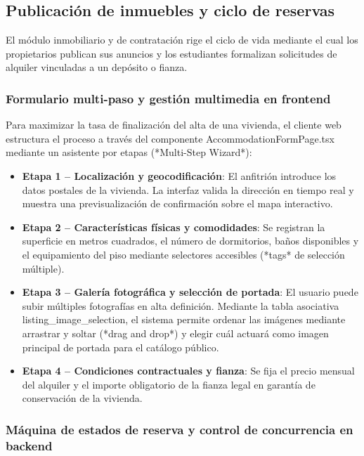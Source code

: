\subsection{Publicación de inmuebles y ciclo de reservas}
\label{subsec:publicacion_reservas}

El módulo inmobiliario y de contratación rige el ciclo de vida mediante el cual los propietarios publican sus anuncios y los estudiantes formalizan solicitudes de alquiler vinculadas a un depósito o fianza.

\subsubsection{Formulario multi-paso y gestión multimedia en frontend}

Para maximizar la tasa de finalización del alta de una vivienda, el cliente web estructura el proceso a través del componente AccommodationFormPage.tsx mediante un asistente por etapas (*Multi-Step Wizard*):

\begin{itemize}
    \item \textbf{Etapa 1 -- Localización y geocodificación}: El anfitrión introduce los datos postales de la vivienda. La interfaz valida la dirección en tiempo real y muestra una previsualización de confirmación sobre el mapa interactivo.
    \item \textbf{Etapa 2 -- Características físicas y comodidades}: Se registran la superficie en metros cuadrados, el número de dormitorios, baños disponibles y el equipamiento del piso mediante selectores accesibles (*tags* de selección múltiple).
    \item \textbf{Etapa 3 -- Galería fotográfica y selección de portada}: El usuario puede subir múltiples fotografías en alta definición. Mediante la tabla asociativa listing_image_selection, el sistema permite ordenar las imágenes mediante arrastrar y soltar (*drag and drop*) y elegir cuál actuará como imagen principal de portada para el catálogo público.
    \item \textbf{Etapa 4 -- Condiciones contractuales y fianza}: Se fija el precio mensual del alquiler y el importe obligatorio de la fianza legal en garantía de conservación de la vivienda.
\end{itemize}

\subsubsection{Máquina de estados de reserva y control de concurrencia en backend}

